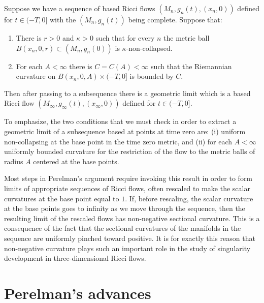 \begin{theorem}
\label{thm:compactness-based-ricci-flows}
Suppose we have a sequence of based Ricci flows
$(M_n,g_n(t),(x_n,0))$ defined for $t\in (-T,0]$ with the
$(M_n,g_n(t))$ being complete. Suppose that:
\begin{enumerate}
\item[(1)] There is $r>0$ and $\kappa>0$ such that for every $n$ the metric ball $B(x_n,0,r)\subset
(M_n,g_n(0))$ is $\kappa$-non-collapsed.
\item[(2)] For each $A<\infty$ there is $C=C(A)<\infty$ such that the Riemannian
curvature on $B(x_n,0,A)\times (-T,0]$ is bounded by $C$.
\end{enumerate}
Then after passing to a subsequence there is a geometric limit which
is a based Ricci flow $(M_\infty,g_\infty(t),(x_\infty,0))$ defined
for $t\in (-T,0]$.
\end{theorem}

To emphasize, the two conditions that we must check in order to
extract a geometric limit of a subsequence based at points at time
zero are: (i) uniform non-collapsing at the base point in the time
zero metric, and (ii) for each $A<\infty$ uniformly bounded
curvature for the restriction of the flow to the metric balls of
radius $A$ centered at the base points.

Most steps in Perelman's argument require invoking this result in order to form
limits of appropriate sequences of Ricci flows, often rescaled to make the
scalar curvatures at the base point equal to $1$. If, before rescaling, the
scalar curvature at the base points goes to infinity as we move through the
sequence, then the resulting limit of the rescaled flows has non-negative
sectional curvature. This is a consequence of the fact that the sectional
curvatures of the manifolds in the sequence are uniformly pinched toward
positive. It is for exactly this reason that non-negative curvature plays such
an important role in the study of singularity development in three-dimensional
Ricci flows.




\section{Perelman's advances}

